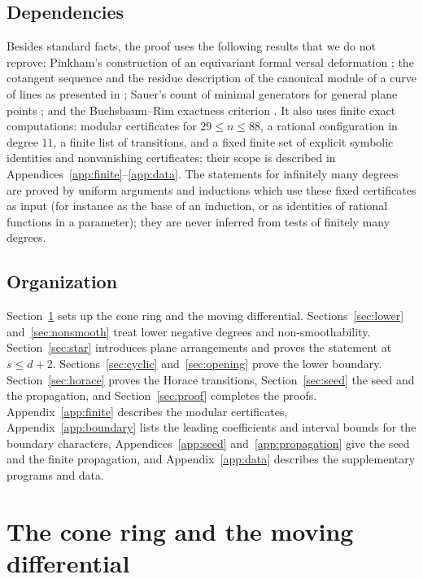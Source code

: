 \documentclass{amsart}
\theoremstyle{definition}
\theoremstyle{remark}
\numberwithin{equation}{section}
\begin{document}
\subsection*{Dependencies}
Besides standard facts, the proof uses the following results that we do not reprove:
Pinkham's construction of an equivariant formal versal deformation \cite{Pinkham}; the
cotangent sequence and the residue description of the canonical module of a curve of lines
as presented in \cite{Stevens}; Sauer's count of minimal generators for general plane points
\cite[Proposition~1.7]{Sauer}; and the Buchsbaum--Rim exactness criterion
\cite{Kustin}. It also uses finite exact computations: modular certificates for
$29\le n\le88$, a rational configuration in degree $11$, a finite list of transitions, and
a fixed finite set of explicit symbolic identities and nonvanishing certificates; their
scope is described in Appendices~\ref{app:finite}--\ref{app:data}. The statements for
infinitely many degrees are proved by uniform arguments and inductions which use these
fixed certificates as input (for instance as the base of an induction, or as identities of
rational functions in a parameter); they are never inferred from tests of finitely many
degrees.

\subsection*{Organization}
Section~\ref{sec:cone} sets up the cone ring and the moving differential.
Sections~\ref{sec:lower} and~\ref{sec:nonsmooth} treat lower negative degrees and
non-smoothability. Section~\ref{sec:star} introduces plane arrangements and proves the
statement at $s\le d+2$. Sections~\ref{sec:cyclic} and~\ref{sec:opening} prove the lower
boundary. Section~\ref{sec:horace} proves the Horace transitions, Section~\ref{sec:seed} the
seed and the propagation, and Section~\ref{sec:proof} completes the proofs.
Appendix~\ref{app:finite} describes the modular certificates, Appendix~\ref{app:boundary}
lists the leading coefficients and interval bounds for the boundary characters,
Appendices~\ref{app:seed} and~\ref{app:propagation} give the seed and the finite
propagation, and Appendix~\ref{app:data} describes the supplementary programs and data.

\section{The cone ring and the moving differential}\label{sec:cone}
\end{document}
